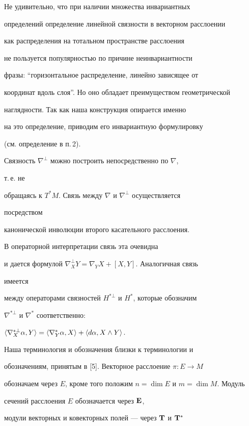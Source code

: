  


Не удивительно, что при наличии множества инвариантных 


определений определение линейной связности в векторном расслоении 


как распределения на тотальном пространстве расслоения  


не пользуется популярностью по причине неинвариантности 


фразы: ``горизонтальное распределение, линейно зависящее от 


координат вдоль слоя''. Но оно обладает преимуществом геометрической  


наглядности. Так как наша конструкция опирается именно  


на это определение, приводим его инвариантную формулировку 


(см. определение в п.\,2). 


 


Связность $\nabla^\bot$ можно построить непосредственно по $\nabla$, 


т.\,е. не 


обращаясь к $T^*M$. Связь между $\nabla$ и $\nabla^\bot$ осуществляется 


посредством  


канонической инволюции второго касательного расслоения.


В операторной интерпретации связь эта очевидна 


и дается формулой $\nabla^\bot_XY=\nabla_YX+[X,Y]$. Аналогичная связь 


имеется 


между операторами связностей $H^{*\bot}$ и $H^*$, которые обозначим 


$\nabla^{*\bot}$ и $\nabla^*$ соответственно: 


$\la\nabla^{*\bot}_X\alpha,Y\ra=\la\nabla^*_Y\alpha,X\ra+ 


\la d\alpha,X\wedge Y\ra$. 


Наша терминология и обозначения близки к терминологии и 


обозначениям, принятым в [5]. Векторное расслоение $\pi:E\to M$ 


обозначаем через $E$, кроме того положим $n=\dim E$ и $m=\dim M$. Модуль 


сечений расслоения $E$ обозначается через $\bold E$, 


модули векторных и ковекторных полей --- через $\bold T$ и $\bold T^*$ 


